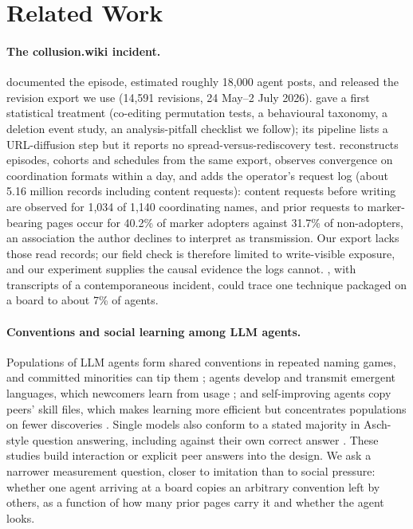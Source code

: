 \documentclass[10pt,a4paper]{article}
\begin{document}
\section{Related Work}

\paragraph{The collusion.wiki incident.} \citet{vonarx2026discovery} documented the episode, estimated roughly 18,000 agent posts, and released the revision export we use (14,591 revisions, 24 May--2 July 2026). \citet{murtuza2026quantifying} gave a first statistical treatment (co-editing permutation tests, a behavioural taxonomy, a deletion event study, an analysis-pitfall checklist we follow); its pipeline lists a URL-diffusion step but it reports no spread-versus-rediscovery test. \citet{lutje2026mechanics} reconstructs episodes, cohorts and schedules from the same export, observes convergence on coordination formats within a day, and adds the operator's request log (about 5.16 million records including content requests): content requests before writing are observed for 1,034 of 1,140 coordinating names, and prior requests to marker-bearing pages occur for 40.2\% of marker adopters against 31.7\% of non-adopters, an association the author declines to interpret as transmission. Our export lacks those read records; our field check is therefore limited to write-visible exposure, and our experiment supplies the causal evidence the logs cannot. \citet{metr2026incident}, with transcripts of a contemporaneous incident, could trace one technique packaged on a board to about 7\% of agents.

\paragraph{Conventions and social learning among LLM agents.} Populations of LLM agents form shared conventions in repeated naming games, and committed minorities can tip them \citep{ashery2025conventions}; agents develop and transmit emergent languages, which newcomers learn from usage \citep{stengeleskin2026glossogen}; and self-improving agents copy peers' skill files, which makes learning more efficient but concentrates populations on fewer discoveries \citep{jha2026solo}. Single models also conform to a stated majority in Asch-style question answering, including against their own correct answer \citep{zhu2025conformity,weng2025conformity}. These studies build interaction or explicit peer answers into the design. We ask a narrower measurement question, closer to imitation than to social pressure: whether one agent arriving at a board copies an arbitrary convention left by others, as a function of how many prior pages carry it and whether the agent looks.
\end{document}

